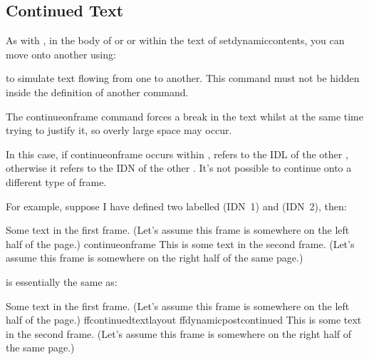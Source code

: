 \documentclass[fontsize=12pt]{scrbook}
\begin{document}
\subsection{Continued Text}\label{sec:dynamiccontinue}

As with , in the body of 
or  or within the text of \gls{setdynamiccontents}, 
you can move onto another  using:
%
to simulate text flowing from one  to another.
This command must not be hidden inside the definition of another
command.

\begin{warning}
The \gls{continueonframe} command forces a break in the text whilst at the same time
trying to justify it, so overly large space may occur.
\end{warning}

In this case, if \gls{continueonframe} occurs within
,  refers to the \gls*{IDL} of the
other , otherwise it refers to the \gls*{IDN} of
the other . It's not possible to continue onto a
different type of frame.

For example, suppose I have defined two  labelled 
 (IDN~1) and  (IDN~2), then:
\begin{codebox}
Some text in the first frame. (Let's
assume this frame is somewhere on the
left half of the page.)
\gls{continueonframe}
This is some text in the second frame. (Let's
assume this frame is somewhere on the
right half of the same page.)
\end{codebox}
is essentially the same as:
\begin{compactcodebox}
Some text in the first frame. (Let's
assume this frame is somewhere on the
left half of the page.)
\gls{ffcontinuedtextlayout}
\gls{ffdynamicpostcontinued}
This is some text in the second frame. (Let's
assume this frame is somewhere on the
right half of the same page.)
\end{compactcodebox}
\end{document}
